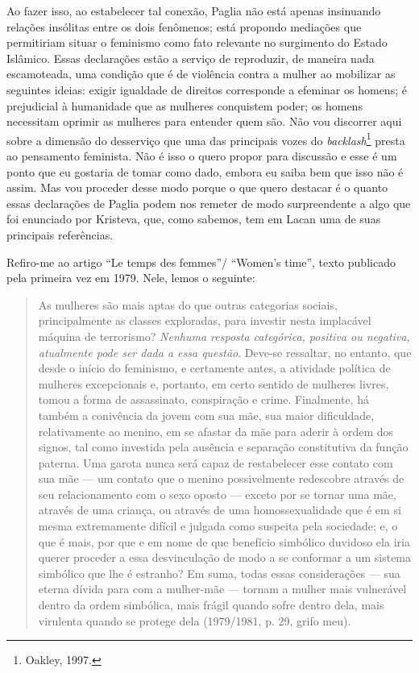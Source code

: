 Ao fazer isso, ao estabelecer tal conexão, Paglia não está apenas
insinuando relações insólitas entre os dois fenômenos; está propondo
mediações que permitiriam situar o feminismo como fato relevante no
surgimento do Estado Islâmico. Essas declarações estão a serviço de
reproduzir, de maneira nada escamoteada, uma condição que é de violência
contra a mulher ao mobilizar as seguintes ideias: exigir igualdade de
direitos corresponde a efeminar os homens; é prejudicial à humanidade
que as mulheres conquistem poder; os homens necessitam oprimir as
mulheres para entender quem são. Não vou discorrer aqui sobre a dimensão
do desserviço que uma das principais vozes do \emph{backlash}\footnote{Oakley,
  1997.} presta ao pensamento feminista. Não é isso o quero propor para
discussão e esse é um ponto que eu gostaria de tomar como dado, embora
eu saiba bem que isso não é assim. Mas vou proceder desse modo porque o
que quero destacar é o quanto essas declarações de Paglia podem nos
remeter de modo surpreendente a algo que foi enunciado por Kristeva,
que, como sabemos, tem em Lacan uma de suas principais referências.

Refiro-me ao artigo ``Le temps des femmes''/ ``Women's time'', texto
publicado pela primeira vez em 1979. Nele, lemos o seguinte:

\begin{quote}
As mulheres são mais aptas do que outras categorias sociais,
principalmente as classes exploradas, para investir nesta implacável
máquina de terrorismo? \emph{Nenhuma resposta categórica, positiva ou
negativa, atualmente pode ser dada a essa questão}. Deve-se ressaltar,
no entanto, que desde o início do feminismo, e certamente antes, a
atividade política de mulheres excepcionais e, portanto, em certo
sentido de mulheres livres, tomou a forma de assassinato, conspiração e
crime. Finalmente, há também a conivência da jovem com sua mãe, sua
maior dificuldade, relativamente ao menino, em se afastar da mãe para
aderir à ordem dos signos, tal como investida pela ausência e separação
constitutiva da função paterna. Uma garota nunca será capaz de
restabelecer esse contato com sua mãe --- um contato que o menino
possivelmente redescobre através de seu relacionamento com o sexo oposto
--- exceto por se tornar uma mãe, através de uma criança, ou através de
uma homossexualidade que é em si mesma extremamente difícil e julgada
como suspeita pela sociedade; e, o que é mais, por que e em nome de que
benefício simbólico duvidoso ela iria querer proceder a essa
desvinculação de modo a se conformar a um sistema simbólico que lhe é
estranho? Em suma, todas essas considerações --- sua eterna dívida para
com a mulher-mãe --- tornam a mulher mais vulnerável dentro da ordem
simbólica, mais frágil quando sofre dentro dela, mais virulenta quando
se protege dela (1979/1981, p. 29, grifo meu).
\end{quote}

